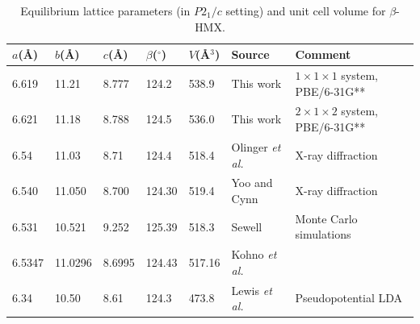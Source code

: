 \commentoutA{\documentclass[prl,aps,twocolumn,twocolumngrid,superbib]{revtex4}}
\begin{document}
\begin{table}[p]
\caption{Equilibrium lattice parameters (in $P2_{1}/c$ setting) 
and unit cell volume for $\beta$-HMX.}
\begin{center}
\begin{tabular}{lllllll}
\hline\hline
$a$(\AA) & $b$(\AA) & $c$(\AA) & $\beta$($^{\circ}$) & $V$(\AA$^3$) & Source & Comment\\ \hline
6.619 & 11.21  &  8.777 & 124.2 & 538.9 & This work & $1\times 1 \times 1$ system, PBE/6-31G**\\
6.621 & 11.18  & 8.788 & 124.5 & 536.0 & This work & $2 \times 1 \times 2$ system, PBE/6-31G**\\
6.54  & 11.03 &  8.71  & 124.4 & 518.4 & Olinger {\it et al.}\cite{BOlinger78} & X-ray diffraction \\
6.540 & 11.050 & 8.700 & 124.30 & 519.4 & Yoo and Cynn\cite{Yoo_1999v111} & X-ray diffraction  \\
6.531 & 10.521  & 9.252& 125.39 & 518.3 & Sewell\cite{TSewell98} & Monte Carlo simulations \\

6.5347 & 11.0296 & 8.6995 & 124.43 & 517.16 & Kohno {\it et al.}\cite{Kohno92} \\
6.34 & 10.50 & 8.61 & 124.3 &  473.8 & Lewis {\it et al.}\cite{JPLewis00} & Pseudopotential LDA \\
\hline\hline
\end{tabular}
\end{center}
\label{tab:lattice}
\end{table}
\end{document}
